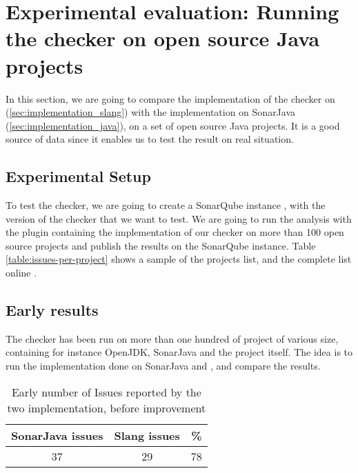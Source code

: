 \section{Experimental evaluation: \newline Running the checker on open source Java projects}
\label{sec:running_checker}

In this section, we are going to compare the implementation of the checker on \slang{}(\ref{sec:implementation_slang}) with the implementation on SonarJava (\ref{sec:implementation_java}), on a set of open source Java projects. It is a good source of data since it enables us to test the result on real situation.

\subsection{Experimental Setup}
\label{subsec:experimental_setup}

To test the checker, we are going to create a SonarQube instance \cite{SonarQube:2019:Online}, with the version of the checker that we want to test. We are going to run the analysis with the plugin containing the implementation of our checker on more than 100 open source projects and publish the results on the SonarQube instance. Table \ref{table:issues-per-project} shows a sample of the projects list, and the complete list online \cite{ListOpenSource:2019:Online}.

\subsection{Early results}
\label{subsec:early_results}

The checker has been run on more than one hundred of project of various size, containing for instance OpenJDK, SonarJava and the \slang{} project itself. 
The idea is to run the implementation done on SonarJava and \slang, and compare the results.

\begin{table}[h]
	\centering
	\caption{Early number of Issues reported by the two implementation, before improvement}
	\label{table:early-sonarjava-vs-slang}
	\begin{tabular}{|c|c|c|}
		\hline
		\bf SonarJava issues & \bf Slang issues & \bf \% \\ \hline
		37 &  29 &  78 \\ \hline
	\end{tabular}
\end{table}



